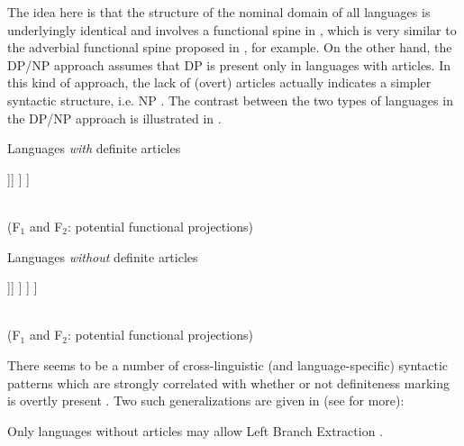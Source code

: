 \documentclass[output=paper,
modfonts
]{langscibook}
\begin{document}
	The idea here is that the structure of the nominal domain of all languages is underlyingly identical and involves a functional spine in , which is very similar to the adverbial functional spine proposed in \citet{Cinque1999}, for example.
	On the other hand, the DP/NP approach assumes that DP is present only in languages with articles. In this kind of approach, the lack of (overt) articles actually indicates a simpler syntactic structure, i.e. NP \citep{Baker2003, Boskovic2008, Boskovic2012, Despic2011, Despic2013, Despic2015}. The contrast between the two types of languages in the DP/NP approach is illustrated in .\pagebreak
	
	\ea \label{ex:despic:2} 
	\ea \label{ex:despic:2a}
	{\normalsize Languages \textit{with} definite articles} \\
	\begin{forest}
		[\textbf{DP}
		[\textbf{D}\\\textit{\textbf{the}}]
		[FP$_{1}$
		[F$_{1}$
		] 
		[FP$_{2}$[F$_{2}$
		][NP[{},roof]]]
		]
		]
	\end{forest}
	\\\vspace{-5pt}(F$_1$ and F$_2$: potential functional projections)
	
	\ex\label{ex:despic:2b} {\normalsize Languages \textit{without} definite articles} \\
	\begin{forest}
		[\textit{(DP projection absent)}%
		[\textbf{}%
		]
		[FP$_{1}$
		[F$_{1}$%
		] %
		[FP$_{2}$[F$_{2}$%
		][NP[{},roof]]]
		]
		]
		]
	\end{forest}
	\\ \vspace{-5pt} (F$_1$ and F$_2$: potential functional projections)
	\z
	\z
	
	There seems to be a number of cross-linguistic (and language-specific) syntactic patterns which are strongly correlated with whether or not definiteness marking is overtly present \citep[e.g.][]{Boskovic2008}. Two such generalizations are given in  (see \citealt{Boskovic2008} for more):
	
	\ea \label{ex:despic:3}
	\ea 
	Only languages without articles may allow Left Branch Extraction
	\citep{Boskovic2008,Boskovic2012}.
	\label{ex:despic:3a}
	
\end{document}
